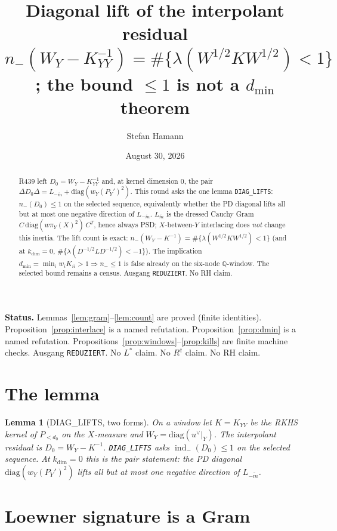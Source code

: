 \documentclass[11pt]{article}
\title{\bfseries Diagonal lift of the interpolant residual\\[2mm]
\large $n_{-}(W_Y-K_{YY}^{-1})=\#\{\lambda(W^{1/2}KW^{1/2})<1\}$;
the bound $\le 1$ is not a $d_{\min}$ theorem}
\author{Stefan Hamann}
\date{August 30, 2026}
\newtheorem{lemma}{Lemma}
\theoremstyle{remark}
\newcommand{\indm}{\operatorname{ind}_{-}}
\begin{document}
\maketitle

\begin{abstract}\noindent
R439 left $D_0=W_Y-K_{YY}^{-1}$ and, at kernel dimension
$0$, the pair
$\Delta D_0\Delta=L_{-\widetilde{m}}+\mathrm{diag}(w_Y(P_Y')^2)$.
This round asks the one lemma
\texttt{DIAG\_LIFTS}: $n_{-}(D_0)\le 1$ on the selected
sequence, equivalently whether the PD diagonal lifts all
but at most one negative direction of $L_{-\widetilde{m}}$.
$L_{\widetilde{m}}$ is the dressed Cauchy Gram
$C\,\mathrm{diag}(w\pi_Y(X)^2)\,C^T$, hence always PSD;
$X$-between-$Y$ interlacing does \emph{not} change this
inertia.
The lift count is exact:
$n_{-}(W_Y-K^{-1})=\#\{\lambda(W^{1/2}KW^{1/2})<1\}$
(and at $k_{\dim}=0$,
$\#\{\lambda(D^{-1/2}LD^{-1/2})<-1\}$).
The implication $d_{\min}=\min_i w_i K_{ii}>1\Rightarrow n_{-}\le 1$
is false already on the six-node $\mathbb{Q}$-window.
The selected bound remains a census.
Ausgang \texttt{REDUZIERT}.
No RH claim.
\end{abstract}

\medskip\noindent
\textbf{Status.}\enspace
Lemmas~\ref{lem:gram}--\ref{lem:count} are proved (finite
identities).
Proposition~\ref{prop:interlace} is a named refutation.
Proposition~\ref{prop:dmin} is a named refutation.
Propositions~\ref{prop:windows}--\ref{prop:kills} are
finite machine checks.
Ausgang \texttt{REDUZIERT}.
No $L^*$ claim.  No $R^\dagger$ claim.  No RH claim.

\section{The lemma}

\begin{lemma}[DIAG\_LIFTS, two forms]
On a window let $K=K_{YY}$ be the RKHS kernel of
$P_{<d_0}$ on the $X$-measure and $W_Y=\mathrm{diag}(u^\vee|_Y)$.
The interpolant residual is $D_0=W_Y-K^{-1}$.
\texttt{DIAG\_LIFTS} asks $\indm(D_0)\le 1$ on the selected
sequence.
At $k_{\dim}=0$ this is the pair statement: the PD
diagonal $\mathrm{diag}(w_Y(P_Y')^2)$ lifts all but at most
one negative direction of $L_{-\widetilde{m}}$.
\end{lemma}

\section{Loewner signature is a Gram}
\end{document}
